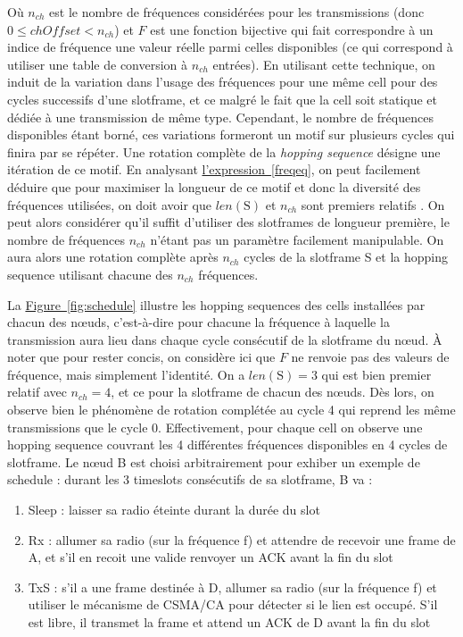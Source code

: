 \documentclass[]{report}
\newcommand{\wordlink}[2]{\hyperref[#2]{#1~\ref{#2}}}
\begin{document}
\par Où $n_{ch}$ est le nombre de fréquences considérées pour les transmissions (donc $0 \leq chOffset < n_{ch}$) et $F$ est une fonction bijective qui fait correspondre à un indice de fréquence une valeur réelle parmi celles disponibles (ce qui correspond à utiliser une table de conversion à $n_{ch}$ entrées). En utilisant cette technique, on induit de la variation dans l'usage des fréquences pour une même cell pour des cycles successifs d'une slotframe, et ce malgré le fait que la cell soit statique et dédiée à une transmission de même type. Cependant, le nombre de fréquences disponibles étant borné, ces variations formeront un motif sur plusieurs cycles qui finira par se répéter. Une rotation complète de la \textit{hopping sequence} désigne une itération de ce motif. En analysant \wordlink{l'expression}{freqeq}, on peut facilement déduire que pour maximiser la longueur de ce motif et donc la diversité des fréquences utilisées, on doit avoir que $len(\text{S})$ et $n_{ch}$ sont premiers relatifs \cite{stack-IoT} \cite{rfc7554}. On peut alors considérer qu'il suffit d'utiliser des slotframes de longueur première, le nombre de fréquences $n_{ch}$ n'étant pas un paramètre facilement manipulable. On aura alors une rotation complète après $n_{ch}$ cycles de la slotframe S et la hopping sequence utilisant chacune des $n_{ch}$ fréquences.\\

\par La \wordlink{Figure}{fig:schedule} illustre les hopping sequences des cells installées par chacun des nœuds, c'est-à-dire pour chacune la fréquence à laquelle la transmission aura lieu dans chaque cycle consécutif de la slotframe du nœud. À noter que pour rester concis, on considère ici que $F$ ne renvoie pas des valeurs de fréquence, mais simplement l'identité. On a $len(\text{S}) = 3$ qui est bien premier relatif avec $n_{ch} = 4$, et ce pour la slotframe de chacun des nœuds. Dès lors, on observe bien le phénomène de rotation complétée au cycle 4 qui reprend les même transmissions que le cycle 0. Effectivement, pour chaque cell on observe une hopping sequence couvrant les 4 différentes fréquences disponibles en 4 cycles de slotframe. Le nœud B est choisi arbitrairement pour exhiber un exemple de schedule : durant les 3 timeslots consécutifs de sa slotframe, B va :

\begin{enumerate}
\item Sleep : laisser sa radio éteinte durant la durée du slot
\item Rx : allumer sa radio (sur la fréquence f) et attendre de recevoir une frame de A, et s'il en recoit une valide renvoyer un ACK avant la fin du slot
\item TxS : s'il a une frame destinée à D, allumer sa radio (sur la fréquence f) et utiliser le mécanisme de CSMA/CA pour détecter si le lien est occupé. S'il est libre, il transmet la frame et attend un ACK de D avant la fin du slot
\end{enumerate}
\end{document}
